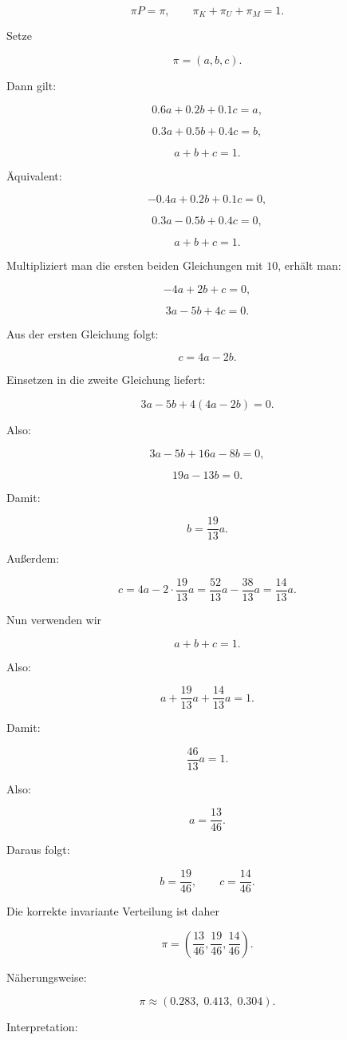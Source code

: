 \documentclass[11pt,a4paper]{article}
\begin{document}
\[
\pi P=\pi,
\qquad
\pi_K+\pi_U+\pi_M=1.
\]

Setze

\[
\pi=(a,b,c).
\]

Dann gilt:

\[
0.6a+0.2b+0.1c=a,
\]

\[
0.3a+0.5b+0.4c=b,
\]

\[
a+b+c=1.
\]

Äquivalent:

\[
-0.4a+0.2b+0.1c=0,
\]

\[
0.3a-0.5b+0.4c=0,
\]

\[
a+b+c=1.
\]

Multipliziert man die ersten beiden Gleichungen mit $10$, erhält man:

\[
-4a+2b+c=0,
\]

\[
3a-5b+4c=0.
\]

Aus der ersten Gleichung folgt:

\[
c=4a-2b.
\]

Einsetzen in die zweite Gleichung liefert:

\[
3a-5b+4(4a-2b)=0.
\]

Also:

\[
3a-5b+16a-8b=0,
\]

\[
19a-13b=0.
\]

Damit:

\[
b=\frac{19}{13}a.
\]

Außerdem:

\[
c=4a-2\cdot \frac{19}{13}a
=
\frac{52}{13}a-\frac{38}{13}a
=
\frac{14}{13}a.
\]

Nun verwenden wir

\[
a+b+c=1.
\]

Also:

\[
a+\frac{19}{13}a+\frac{14}{13}a=1.
\]

Damit:

\[
\frac{46}{13}a=1.
\]

Also:

\[
a=\frac{13}{46}.
\]

Daraus folgt:

\[
b=\frac{19}{46},
\qquad
c=\frac{14}{46}.
\]

Die korrekte invariante Verteilung ist daher

\[
\boxed{
\pi=
\left(
\frac{13}{46},
\frac{19}{46},
\frac{14}{46}
\right)
}.
\]

Näherungsweise:

\[
\pi\approx (0.283,\;0.413,\;0.304).
\]

Interpretation:
\end{document}
